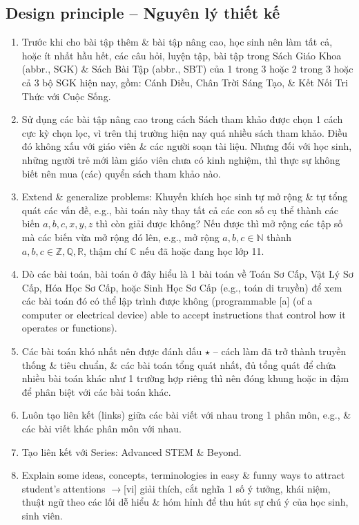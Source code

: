 \documentclass[12pt,oneside]{book}
\begin{document}
\subsection{Design principle -- Nguyên lý thiết kế}

\begin{enumerate}
	\item Trước khi cho bài tập thêm \& bài tập nâng cao, học sinh nên làm tất cả, hoặc ít nhất hầu hết, các câu hỏi, luyện tập, bài tập trong Sách Giáo Khoa (abbr., SGK) \& Sách Bài Tập (abbr., SBT) của 1 trong 3 hoặc 2 trong 3 hoặc cả 3 bộ SGK hiện nay, gồm: Cánh Diều, Chân Trời Sáng Tạo, \& Kết Nối Tri Thức với Cuộc Sống.
	\item Sử dụng các bài tập nâng cao trong cách Sách tham khảo được chọn 1 cách cực kỳ chọn lọc, vì trên thị trường hiện nay quá nhiều sách tham khảo. Điều đó không xấu với giáo viên \& các người soạn tài liệu. Nhưng đối với học sinh, những người trẻ mới làm giáo viên chưa có kinh nghiệm, thì thực sự không biết nên mua (các) quyển sách tham khảo nào.
	\item Extend \& generalize problems: Khuyến khích học sinh tự mở rộng \& tự tổng quát các vấn đề, e.g., bài toán này thay tất cả các con số cụ thể thành các biến $a,b,c,x,y,z$ thì còn giải được không? Nếu được thì mở rộng các tập số mà các biến vừa mở rộng đó lên, e.g., mở rộng $a,b,c\in\mathbb{N}$ thành $a,b,c\in\mathbb{Z},\mathbb{Q},\mathbb{R}$, thậm chí $\mathbb{C}$ nếu đã hoặc đang học lớp 11.
	\item Dò các bài toán, bài toán ở đây hiểu là 1 bài toán về Toán Sơ Cấp, Vật Lý Sơ Cấp, Hóa Học Sơ Cấp, hoặc Sinh Học Sơ Cấp (e.g., toán di truyền) để xem các bài toán đó có thể lập trình được không (programmable [a] {\sf (of a computer or electrical device) able to accept instructions that control how it operates or functions}).
	\item Các bài toán khó nhất nên được đánh dấu $\star$ -- cách làm đã trở thành truyền thống \& tiêu chuẩn, \& các bài toán tổng quát nhất, đủ tổng quát để chứa nhiều bài toán khác như 1 trường hợp riêng thì nên đóng khung hoặc in đậm để phân biệt với các bài toán khác.
	\item Luôn tạo liên kết (links) giữa các bài viết với nhau trong 1 phân môn, e.g., \& các bài viết khác phân môn với nhau.
	\item Tạo liên kết với Series: Advanced STEM \& Beyond.
	\item Explain some ideas, concepts, terminologies in easy \& funny ways to attract student's attentions {\sf[en]$\to$[vi]} giải thích, cắt nghĩa 1 số ý tưởng, khái niệm, thuật ngữ theo các lối dễ hiểu \& hóm hỉnh để thu hút sự chú ý của học sinh, sinh viên.
\end{enumerate}
\end{document}

